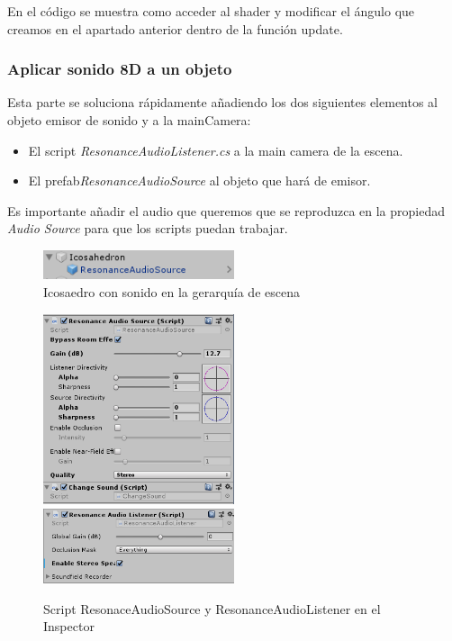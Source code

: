 \quad En el código se muestra como acceder al shader y modificar el ángulo que creamos en el apartado anterior dentro de la función update.\\

\subsubsection{Aplicar sonido 8D a un objeto}

\quad Esta parte se soluciona rápidamente añadiendo los dos siguientes elementos al objeto emisor de sonido y a la mainCamera:\\

\begin{itemize}
	\item El script \textit{ResonanceAudioListener.cs} a la main camera de la escena.
	\item El prefab\textit{ResonanceAudioSource} al objeto que hará de emisor.
\end{itemize}

\quad Es importante añadir el audio que queremos que se reproduzca en la propiedad \textit{Audio Source} para que los scripts puedan trabajar.

\begin{figure}[htb]
	\centering
	\includegraphics[width=0.5\textwidth]{./imagenes/icosaedronHiche}
	\caption{Icosaedro con sonido en la gerarquía de escena}
\end{figure} 

\begin{figure}[htb]
	\centering
	\includegraphics[width=0.5\textwidth]{./imagenes/audiosource}
	\includegraphics[width=0.5\textwidth]{./imagenes/audiolistener}
	\caption{Script ResonaceAudioSource y ResonanceAudioListener en el Inspector}
\end{figure} 

